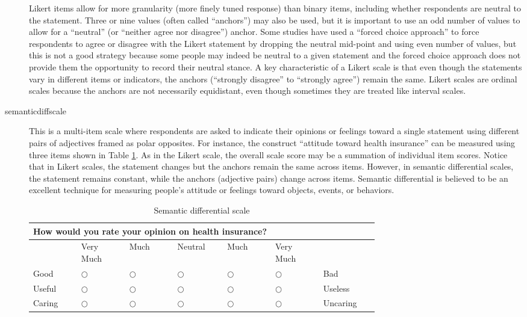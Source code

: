 \begin{description}
	Likert items allow for more granularity (more finely tuned response) than binary items, including whether respondents are neutral to the statement. Three or nine values (often called ``anchors'') may also be used, but it is important to use an odd number of values to allow for a ``neutral'' (or ``neither agree nor disagree'') anchor. Some studies have used a ``forced choice approach'' to force respondents to agree or disagree with the Likert statement by dropping the neutral mid-point and using even number of values, but this is not a good strategy because some people may indeed be neutral to a given statement and the forced choice approach does not provide them the opportunity to record their neutral stance. A key characteristic of a Likert scale is that even though the statements vary in different items or indicators, the anchors (``strongly disagree'' to ``strongly agree'') remain the same. Likert scales are ordinal scales because the anchors are not necessarily equidistant, even though sometimes they are treated like interval scales.
	
	\item[\Gls{semanticdiffscale}] This is a multi-item scale where respondents are asked to indicate their opinions or feelings toward a single statement using different pairs of adjectives framed as polar opposites. For instance, the construct ``attitude toward health insurance'' can be measured using three items shown in Table \ref{tab06.04}. As in the Likert scale, the overall scale score may be a summation of individual item scores. Notice that in Likert scales, the statement changes but the anchors remain the same across items. However, in semantic differential scales, the statement remains constant, while the anchors (adjective pairs) change across items. Semantic differential is believed to be an excellent technique for measuring people's attitude or feelings toward objects, events, or behaviors. 
	
	
	\begin{table}[H]
		\centering
		\begin{tabularx}{0.95\linewidth}{p{0.10\linewidth}p{0.10\linewidth}p{0.10\linewidth}p{0.10\linewidth}p{0.10\linewidth}p{0.10\linewidth}p{0.10\linewidth}}
			\toprule
			\multicolumn{7}{p{0.95\linewidth}}{How would you rate your opinion on health insurance?} \\	
			\midrule
			{} & {\footnotesize Very Much} & {\footnotesize Much} & {\footnotesize Neutral} & {\footnotesize Much} & {\footnotesize Very Much} & {} \\
			\midrule
			{\footnotesize Good} & $ \bigcirc $ & $ \bigcirc $ & $ \bigcirc $ & $ \bigcirc $ & $ \bigcirc $ & {\footnotesize Bad} \\
			{\footnotesize Useful} & $ \bigcirc $ & $ \bigcirc $ & $ \bigcirc $ & $ \bigcirc $ & $ \bigcirc $ & {\footnotesize Useless} \\
			{\footnotesize Caring} & $ \bigcirc $ & $ \bigcirc $ & $ \bigcirc $ & $ \bigcirc $ & $ \bigcirc $ & {\footnotesize Uncaring} \\
			\bottomrule
		\end{tabularx}
		\caption{Semantic differential scale}
		\label{tab06.04}
	\end{table}
	

\end{description}
